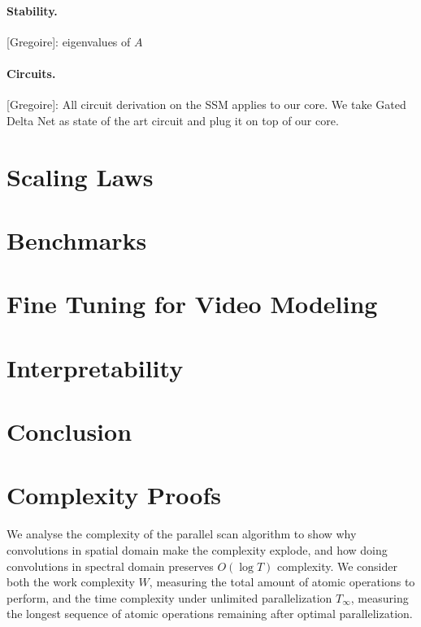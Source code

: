\documentclass{article}
\newcommand{\greg}[1]{{\color{indigo}[Gregoire]: #1}}
\begin{document}
\paragraph{Stability.} \greg{eigenvalues of $A$}

\paragraph{Circuits.} \greg{All circuit derivation on the SSM applies to our core. We take Gated Delta Net as state of the art circuit and plug it on top of our core.}

\section{Scaling Laws}

\section{Benchmarks}

\section{Fine Tuning for Video Modeling}

\section{Interpretability}

\section{Conclusion}




\newpage
\appendix

\section{Complexity Proofs}
\label{app:complexity_proofs}

We analyse the complexity of the parallel scan algorithm to show why convolutions in spatial domain make the complexity explode, and how doing convolutions in spectral domain preserves $O(\log T)$ complexity. We consider both the work complexity $W$, measuring the total amount of atomic operations to perform, and the time complexity under unlimited parallelization $T_\infty$, measuring the longest sequence of atomic operations remaining after optimal parallelization.
\end{document}
